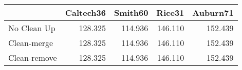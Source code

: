 \begin{tabular}{lrrrr}
\toprule
{} & Caltech36 & Smith60 &  Rice31 & Auburn71 \\
\midrule
No Clean Up  &   128.325 & 114.936 & 146.110 &  152.439 \\
Clean-merge  &   128.325 & 114.936 & 146.110 &  152.439 \\
Clean-remove &   128.325 & 114.936 & 146.110 &  152.439 \\
\bottomrule
\end{tabular}
